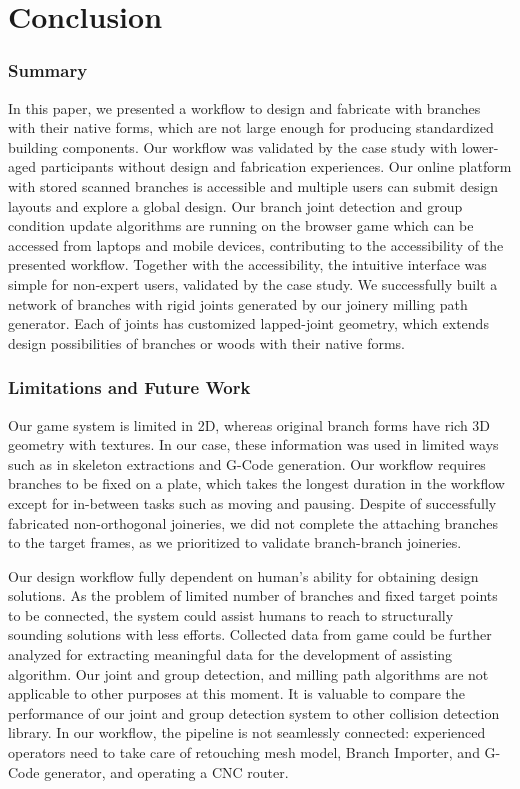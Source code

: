\section{Conclusion}
\subsubsection*{Summary}
In this paper, we presented a workflow to design and fabricate with branches with their native forms, which are not large enough for producing standardized building components.
Our workflow was validated by the case study with lower-aged participants without design and fabrication experiences.
Our online platform with stored scanned branches is accessible and multiple users can submit design layouts and explore a global design. %
Our branch joint detection and group condition update algorithms are running on the browser game which can be accessed from laptops and mobile devices, contributing to the accessibility of the presented workflow.
Together with the accessibility, the intuitive interface was simple for non-expert users, validated by the case study.
We successfully built a network of branches with rigid joints generated by our joinery milling path generator.
Each of joints has customized lapped-joint geometry, which extends design possibilities of branches or woods with their native forms.

\subsubsection*{Limitations and Future Work}
Our game system is limited in 2D, whereas original branch forms have rich 3D geometry with textures.
In our case, these information was used in limited ways such as in skeleton extractions and G-Code generation.
Our workflow requires branches to be fixed on a plate, which takes the longest duration in the workflow except for in-between tasks such as moving and pausing.
Despite of successfully fabricated non-orthogonal joineries, we did not complete the attaching branches to the target frames, as we prioritized to validate branch-branch joineries.

Our design workflow fully dependent on human's ability for obtaining design solutions.
As the problem of limited number of branches and fixed target points to be connected, the system could assist humans to reach to structurally sounding solutions with less efforts.
Collected data from game could be further analyzed for extracting meaningful data for the development of assisting algorithm.
Our joint and group detection, and milling path algorithms are not applicable to other purposes at this moment.
It is valuable to compare the performance of our joint and group detection system to other collision detection library.
In our workflow, the pipeline is not seamlessly connected: experienced operators need to take care of retouching mesh model, Branch Importer, and G-Code generator, and operating a CNC router.
